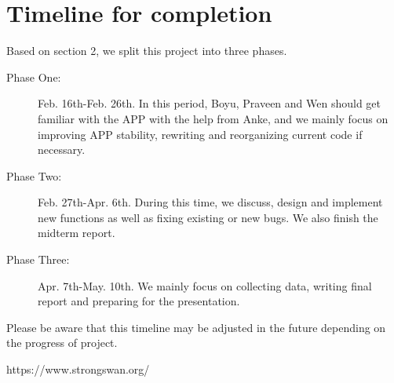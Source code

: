 \documentclass[letterpaper]{sig-alternate-10pt}
\begin{document}
\section{Timeline for completion}
Based on section 2, we split this project into three phases.
\begin{description}
  \item[Phase One:] Feb. 16th-Feb. 26th. In this period, Boyu, Praveen and Wen should get familiar with the APP with the help from Anke, and we mainly focus on improving APP stability, rewriting and reorganizing current code if necessary.
  \item[Phase Two:] Feb. 27th-Apr. 6th. During this time, we discuss, design and implement new functions as well as fixing existing or new bugs. We also finish the midterm report.
  \item[Phase Three:] Apr. 7th-May. 10th. We mainly focus on collecting data, writing final report and preparing for the presentation.
\end{description}

Please be aware that this timeline may be adjusted in the future depending on the progress of project.

\begin{small}
	
\end{small}

\begin{thebibliography}{9}

  https://www.strongswan.org/

\iffalse
\bibitem{lamport94}
  Leslie Lamport,
  \emph{\LaTeX: a document preparation system}.
  Addison Wesley, Massachusetts,
  2nd edition,
  1994.
\fi

\end{thebibliography}
\end{document}
